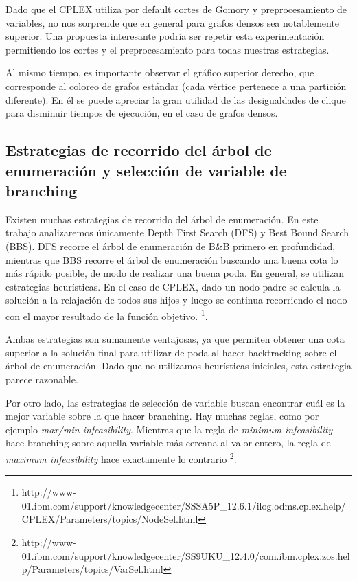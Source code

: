 Dado que el CPLEX utiliza por default cortes de Gomory y preprocesamiento de variables, no nos sorprende que en general para grafos densos sea notablemente superior. Una propuesta interesante podría ser repetir esta experimentación permitiendo los cortes y el preprocesamiento para todas nuestras estrategias.

Al mismo tiempo, es importante observar el gráfico superior derecho, que corresponde al coloreo de grafos estándar (cada vértice pertenece a una partición diferente). En él se puede apreciar la gran utilidad de las desigualdades de clique para disminuir tiempos de ejecución, en el caso de grafos densos. 

\subsection{Estrategias de recorrido del árbol de enumeración
y selección de variable de branching}

Existen muchas estrategias de recorrido del árbol de enumeración. En este trabajo analizaremos únicamente Depth First Search (DFS) y Best Bound Search (BBS). DFS recorre el árbol de enumeración de B\&B primero en profundidad, mientras que BBS recorre el árbol de enumeración buscando una buena cota lo más rápido posible, de modo de realizar una buena poda. En general, se utilizan estrategias heurísticas. En el caso de CPLEX, dado un nodo padre se calcula la solución a la relajación de todos sus hijos y luego se continua recorriendo el nodo con el mayor resultado de la función objetivo. \footnote{http://www-01.ibm.com/support/knowledgecenter/SSSA5P\_12.6.1/ilog.odms.cplex.help/CPLEX/Parameters/topics/NodeSel.html}.

Ambas estrategias son sumamente ventajosas, ya que permiten obtener una cota superior a la solución final para utilizar de poda al hacer backtracking sobre el árbol de enumeración. Dado que no utilizamos heurísticas iniciales, esta estrategia parece razonable. 

Por otro lado, las estrategias de selección de variable buscan encontrar cuál es la mejor variable sobre la que hacer branching. Hay muchas reglas, como por ejemplo \textit{max/min infeasibility}. Mientras que la regla de \textit{minimum infeasibility} hace branching sobre aquella variable más cercana al valor entero, la regla de \textit{maximum infeasibility} hace exactamente lo contrario \footnote{http://www-01.ibm.com/support/knowledgecenter/SS9UKU\_12.4.0/com.ibm.cplex.zos.help/Parameters/topics/VarSel.html}.

